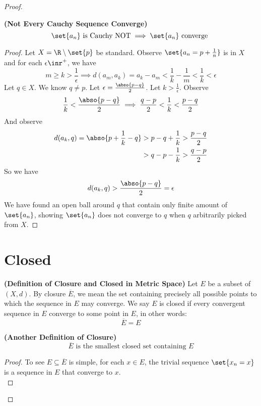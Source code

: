 \documentclass{report}
\begin{document}
\begin{proof}
\begin{theorem}
\label{3.1.12}
\textbf{(Not Every Cauchy Sequence Converge)} 
\begin{equation*}
\set{a_n}\text{ is Cauchy NOT}\implies \set{a_n}\text{ converge }
\end{equation*}
\end{theorem}
\begin{proof}
Let $X=\R \setminus \set{p}$ be standard. Observe $\set{a_n=p+\frac{1}{n}}$ is in $X$ and for each $\epsilon \inr^+$, we have
\begin{equation*}
m\geq k>\frac{1}{\epsilon } \implies d(a_m,a_k)= a_k-a_m<\frac{1}{k}-\frac{1}{m}<\frac{1}{k}<\epsilon 
\end{equation*}
Let $q\in X$. We know $q\neq p$. Let $\epsilon =\frac{\abso{p-q}}{2}$. Let $k>\frac{1}{\epsilon }$. Observe
\begin{equation*}
\frac{1}{k}<\frac{\abso{p-q}}{2}\implies \frac{q-p}{2}<\frac{1}{k}<\frac{p-q}{2}
\end{equation*}
And observe
\begin{align*}
  d(a_k,q)=\abso{p+\frac{1}{k}-q}&>p-q+\frac{1}{k}>\frac{p-q}{2}\\
  &>q-p-\frac{1}{k}>\frac{q-p}{2}
\end{align*}
So we have
\begin{equation*}
d(a_k,q)>\frac{\abso{p-q}}{2}=\epsilon 
\end{equation*}
We have found an open ball around $q$ that contain only finite amount of  $\set{a_n}$, showing $\set{a_n}$ does not converge to $q$ when $q$ arbitrarily picked from  $X$.

\end{proof}
\section{Closed}
\begin{definition}
\label{3.2.1}
\textbf{(Definition of Closure and Closed in Metric Space)} Let $E$ be a subset of  $(X,d)$. By closure $\overline{E}$, we mean the set containing precisely all possible points to which the sequence in $E$ may converge. We say $E$ is closed if every convergent sequence in $E$ converge to some point in $E$, in other words:
 \begin{equation*}
\overline{E}=E
\end{equation*}
\end{definition}
\begin{theorem}
\label{3.2.2}
\textbf{(Another Definition of Closure)}
\begin{equation*}
\overline{E}\text{ is the smallest closed set containing }E
\end{equation*}
\end{theorem}
\begin{proof}
To see $E\subseteq \overline{E}$ is simple, for each $x\in E$, the trivial sequence $\set{x_n=x}$ is a sequence in $E$ that converge to $x$.\\


\end{proof}
\end{proof}
\end{document}

